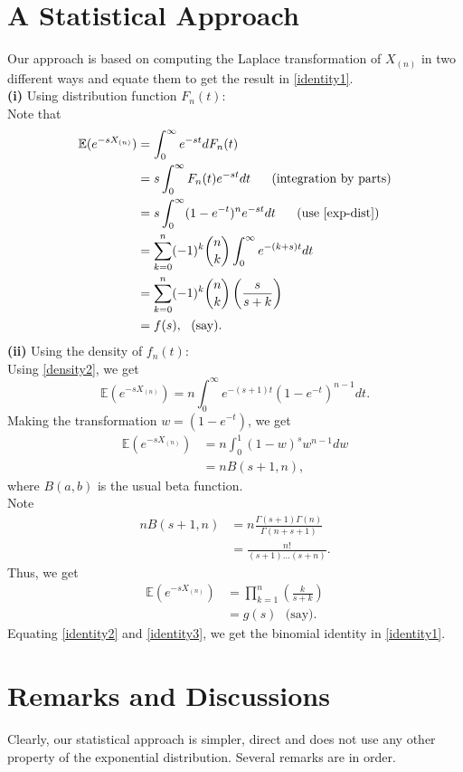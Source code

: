 \documentclass[11pt]{amsart}
\numberwithin{equation}{section}
\begin{document}
\section{A Statistical Approach}
Our approach is based on computing the Laplace transformation of $X_{(n)}$ in two different ways and equate them to get the result in \eqref{identity1}.\vspace{0.1cm}\\
{\bf(i)} Using distribution function $F_{n}(t):$\\
Note that 
\begin{align}
 \mathbb{E}(e^{-sX_{(n)}})&=\int_{0}^{\infty}e^{-st}dF_{n}(t)\nonumber\\
 &=s\int_{0}^{\infty}F_{n}(t)e^{-st}dt~~~~~\text{(integration by parts)}\nonumber\\
 &=s\int_{0}^{\infty}(1-e^{-t})^{n}e^{-st}dt~~~~~(\text{use } \eqref{exp-dist})\nonumber\\
 &=\sum_{k=0}^{n}(-1)^{k}\binom{n}{k}\int_{0}^{\infty}e^{-(k+s)t}dt\nonumber\\
 &=\sum_{k=0}^{n}(-1)^{k}\binom{n}{k}\left(\frac{s}{s+k}\right)\label{identity2}\\
 &=f(s),~~(\text{say}).\nonumber
\end{align}
{\bf (ii)} Using the density of $f_{n}(t)$:\\ Using \eqref{density2}, we get
\begin{equation*}
 \mathbb{E}(e^{-sX_{(n)}})=n\int_{0}^{\infty}e^{-(s+1)t}(1-e^{-t})^{n-1}dt.
\end{equation*}
Making the transformation $w=(1-e^{-t})$, we get
\begin{align*}
 \mathbb{E}(e^{-sX_{(n)}})&=n\int_{0}^{1}(1-w)^{s}w^{n-1}dw\nonumber\\
 &=nB(s+1,n),
\end{align*}
where $B(a,b)$ is the usual beta function.\\
Note 
\begin{align*}
 nB(s+1,n)&=n\frac{\Gamma(s+1)\Gamma(n)}{\Gamma(n+s+1)}\\
 &=\frac{n!}{(s+1)\ldots (s+n)}.
\end{align*}
Thus, we get 
\begin{align}
 \mathbb{E}(e^{-sX_{(n)}})&=\prod_{k=1}^{n}\left(\frac{k}{s+k}\right)\label{identity3}\\
 &=g(s)~~~\text{(say)}.\nonumber
\end{align}
Equating \eqref{identity2} and \eqref{identity3}, we get the binomial identity in \eqref{identity1}.
\section{Remarks and Discussions}
Clearly, our statistical approach is simpler, direct and does not use any other property of the exponential distribution. Several remarks are in order.\\
\end{document}

